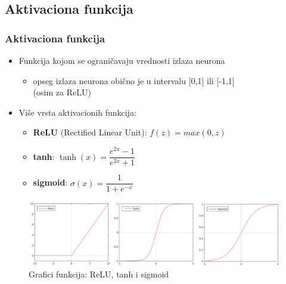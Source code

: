 \documentclass{beamer}
\begin{document}
\subsection{Aktivaciona funkcija}
\begin{frame}
\frametitle{Aktivaciona funkcija}

\begin{itemize}
\item Funkcija kojom se ograničavaju vrednosti izlaza neurona
\begin{itemize}
\item opseg izlaza neurona obično je u intervalu [0,1] ili [-1,1] \\
(osim za ReLU)
\end{itemize}
\item Više vrsta aktivacionih funkcija:
\begin{itemize}
\item \textbf{ReLU} (Rectified Linear Unit): $f(z)=max(0, z)$
\item \textbf{tanh}: $\tanh(x) = \dfrac{e^{2x}-1}{e^{2x}+1}$
\item \textbf{sigmoid}: $\sigma(x) = \dfrac{1}{1 + e^{-x}}$
\end{itemize}
\end{itemize}


\begin{figure}
\includegraphics[scale=0.38]{graphs_prez.png}
\caption{Grafici funkcija: ReLU, tanh i sigmoid}
\end{figure}

\end{frame}
\end{document}
